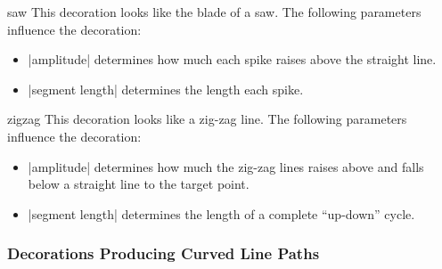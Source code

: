 \begin{decoration}{saw}
  This decoration looks like the blade of a saw. The following parameters
  influence the decoration:
  \begin{itemize}
  \item |amplitude|
    determines how much each spike raises above the straight line.
  \item |segment length|
    determines the length each spike.
  \end{itemize}
\begin{codeexample}[]
\end{codeexample}
\end{decoration}


\begin{decoration}{zigzag}
  This decoration looks like a zig-zag line. The following parameters
  influence the decoration:
  \begin{itemize}
  \item |amplitude|
    determines how much the zig-zag lines raises above and falls below
    a straight line to the target point.
  \item |segment length|
    determines the length of a complete ``up-down'' cycle.
  \end{itemize}
\begin{codeexample}[]
\end{codeexample}
\end{decoration}



\subsubsection{Decorations Producing Curved Line Paths}

